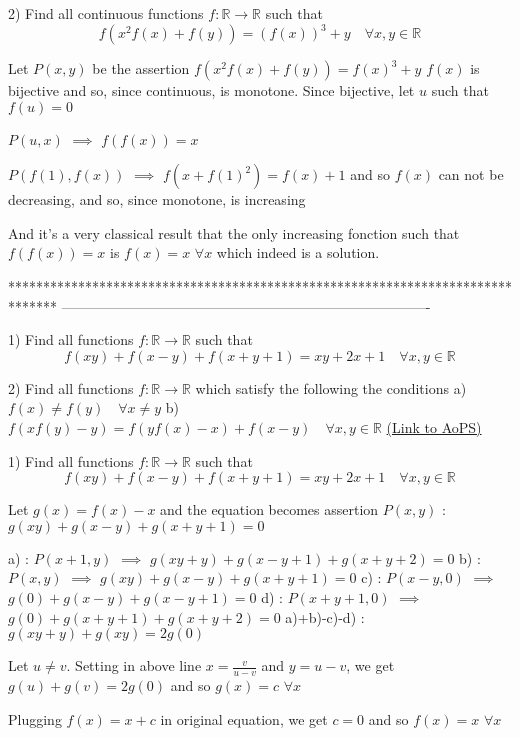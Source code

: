 \begin{solution}
	\begin{tcolorbox}2) Find all continuous functions $f:\mathbb{R}\to\mathbb{R}$  such that
\[f(x^{2}f(x)+f(y))=(f(x))^3+y \quad \forall x,y \in \mathbb{R}\]\end{tcolorbox}
Let $P(x,y)$ be the assertion $f(x^2f(x)+f(y))=f(x)^3+y$
$f(x)$ is bijective and so, since continuous, is monotone.
Since bijective, let $u$ such that $f(u)=0$

$P(u,x)$ $\implies$ $f(f(x))=x$

$P(f(1),f(x))$ $\implies$ $f(x+f(1)^2)=f(x)+1$ and so $f(x)$ can not be decreasing, and so, since monotone, is increasing

And it's a very classical result that the only increasing fonction such that $f(f(x))=x$ is $\boxed{f(x)=x}$ $\forall x$ which indeed is a solution.
\end{solution}
*******************************************************************************
-------------------------------------------------------------------------------

\begin{problem}
	1) Find all functions $f:\mathbb{R}\to\mathbb{R}$  such that 
\[f(xy)+f(x-y)+f(x+y+1)=xy+2x+1  \quad \forall x,y \in \mathbb{R}\]

2)  Find all functions $f:\mathbb{R}\to\mathbb{R}$  which satisfy the following the conditions 
a) $f(x)\neq f(y) \quad \forall x\neq y$
b) $f(xf(y)-y)=f(yf(x)-x)+f(x-y) \quad \forall x,y \in \mathbb{R}$
	\flushright \href{https://artofproblemsolving.com/community/c6h563603}{(Link to AoPS)}
\end{problem}



\begin{solution}
	\begin{tcolorbox}1) Find all functions $f:\mathbb{R}\to\mathbb{R}$  such that 
\[f(xy)+f(x-y)+f(x+y+1)=xy+2x+1  \quad \forall x,y \in \mathbb{R}\]\end{tcolorbox}
Let $g(x)=f(x)-x$ and the equation becomes assertion $P(x,y)$ : $g(xy)+g(x-y)+g(x+y+1)=0$

a) : $P(x+1,y)$ $\implies$ $g(xy+y)+g(x-y+1)+g(x+y+2)=0$
b) : $P(x,y)$ $\implies$  $g(xy)+g(x-y)+g(x+y+1)=0$
c) : $P(x-y,0)$ $\implies$ $g(0)+g(x-y)+g(x-y+1)=0$
d) : $P(x+y+1,0)$ $\implies$ $g(0)+g(x+y+1)+g(x+y+2)=0$
a)+b)-c)-d) : $g(xy+y)+g(xy)=2g(0)$

Let $u\ne v$. Setting in above line $x=\frac v{u-v}$ and $y=u-v$, we get $g(u)+g(v)=2g(0)$ and so $g(x)=c$ $\forall x$

Plugging $f(x)=x+c$ in original equation, we get $c=0$ and so $\boxed{f(x)=x}$ $\forall x$
\end{solution}



